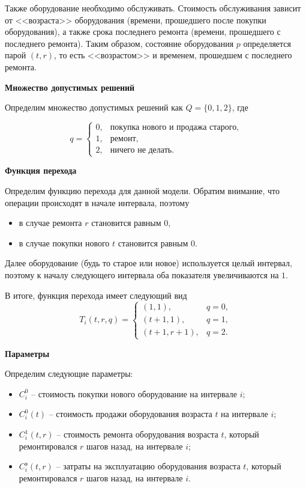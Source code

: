 Также оборудование необходимо обслуживать. Стоимость обслуживания зависит от <<возраста>> оборудования (времени, прошедшего после покупки оборудования), а также срока последнего ремонта (времени, прошедшего с последнего ремонта).
Таким образом, состояние оборудования $p$ определяется парой $(t,r)$, то есть <<возрастом>> и временем, прошедшем с последнего ремонта.

\bigskip

\textbf{Множество допустимых решений}

Определим множество допустимых решений как $Q = \{0, 1, 2\}$, где

\[
q = 
\begin{cases}
	0, & \text{покупка нового и продажа старого}, \\
	1, & \text{ремонт}, \\
	2, & \text{ничего не делать}.
\end{cases}
\]

\bigskip

\textbf{Функция перехода}

Определим функцию перехода для данной модели. Обратим внимание, что операции происходят в начале интервала, поэтому

\begin{itemize}[nosep]
	\item в случае ремонта $r$ становится равным $0$,
	
	\item в случае покупки нового $t$ становится равным $0$.
\end{itemize}

Далее оборудование (будь то старое или новое) используется целый интервал, поэтому к началу следующего интервала оба показателя увеличиваются на $1$.

В итоге, функция перехода имеет следующий вид
\[
T_i(t, r, q) = 
\begin{cases}
	(1, 1), & q = 0, \\
	(t+1, 1), & q = 1, \\
	(t+1, r+1), & q = 2.
\end{cases}
\]


\bigskip

\textbf{Параметры}

Определим следующие параметры:
\begin{itemize}[nosep]
	\item $C_i^0$ -- стоимость покупки нового оборудование на интервале $i$;
	\item $C_i^0(t)$ -- стоимость продажи оборудования возраста $t$ на интервале $i$;
	\item $C_i^1(t, r)$ -- стоимость ремонта оборудования возраста $t$, который ремонтировался $r$ шагов назад, на интервале $i$;
	\item $C_i^\text{э} (t,r)$ -- затраты на эксплуатацию оборудования возраста $t$, который ремонтировался $r$ шагов назад, на интервале $i$.
\end{itemize}

